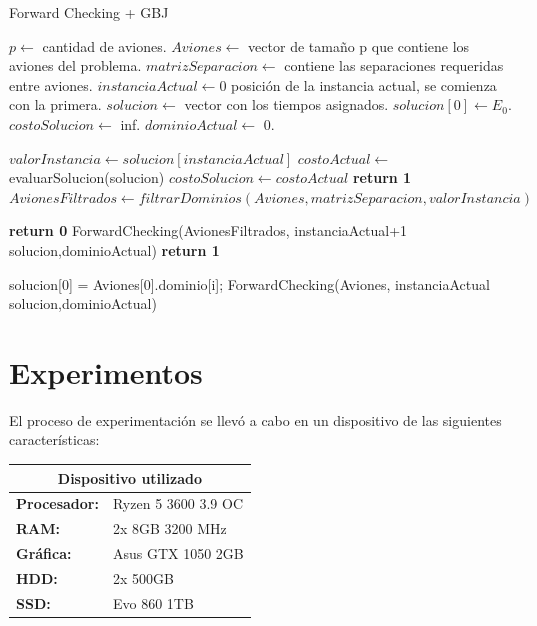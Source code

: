 \documentclass[letter, 10pt]{article}
\begin{document}
\begin{algorithm}[h]
\caption{Forward Checking + GBJ}\label{euclid}
\begin{algorithmic}[1]
    \BState $p \gets$ cantidad de aviones.
    \BState $Aviones \gets$ vector de tamaño p que contiene los aviones del problema.
    \State $matrizSeparacion \gets$ contiene las separaciones requeridas entre aviones.
    \BState $instanciaActual \gets 0$ posición de la instancia actual, se comienza con la primera.
    \BState $solucion \gets$ vector con los tiempos asignados.
    \State $solucion[0] \gets E_0$.
    \State $costoSolucion \gets$ inf.
    \State $dominioActual \gets$ 0.

    \State $valorInstancia \gets solucion[instanciaActual]$
    \State $costoActual \gets$ evaluarSolucion(solucion)
    \State $costoSolucion \gets costoActual$
    \EndIf
    \State \textbf{return 1}
    \EndIf
    \State $AvionesFiltrados \gets filtrarDominios(Aviones, matrizSeparacion, valorInstancia)$ 
    
    \State \textbf{return 0}
    \Else 
    \State ForwardChecking(AvionesFiltrados, instanciaActual+1 solucion,dominioActual)
    \EndFor
    \State \textbf{return 1}
    \EndIf
    
    
    
    \EndProcedure
    
    \State solucion[0] = Aviones[0].dominio[i];
    \State ForwardChecking(Aviones, instanciaActual solucion,dominioActual)
    \EndFor
    
    \end{algorithmic}
\end{algorithm}


\section{Experimentos}
El proceso de experimentación se llevó a cabo en un dispositivo de las siguientes características:\\

\begin{table}[h]
\centering
\begin{tabular}{|l|l|}
\hline
\multicolumn{2}{|c|}{\textbf{Dispositivo utilizado}} \\ \hline
\textbf{Procesador:}      & Ryzen 5 3600 3.9 OC      \\ \hline
\textbf{RAM:}             & 2x 8GB 3200 MHz          \\ \hline
\textbf{Gráfica:}         & Asus GTX 1050 2GB        \\ \hline
\textbf{HDD:}             & 2x 500GB                 \\ \hline
\textbf{SSD:}             & Evo 860 1TB              \\ \hline
\end{tabular}
\end{table}
\end{document}
